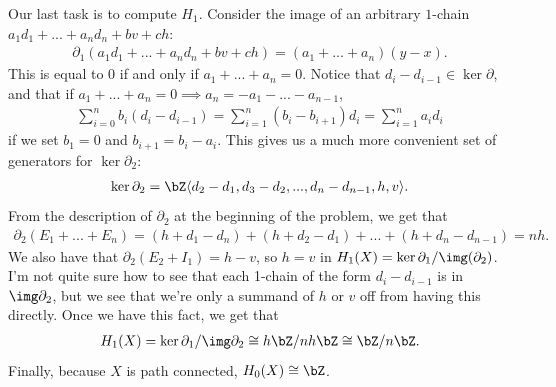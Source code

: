 \begin{homework}[e]
\begin{prf}
    Our last task is to compute $H_1$. Consider the image of an arbitrary $1$-chain $a_1d_1+...+a_nd_n + bv+ch$:
    \begin{align*}
      \partial_1(a_1d_1+...+a_nd_n + bv+ch) = (a_1+...+a_n)(y - x).
    \end{align*}
    This is equal to $0$ if and only if $a_1+...+a_n = 0$. Notice that $d_i - d_{i-1} \in \ker\partial$, and that if $a_1+ ... + a_n = 0\implies a_n = -a_1 - ... - a_{n-1}$,
    \begin{align*}
      \sum_{i=0}^nb_i (d_i - d_{i-1}) = \sum_{i=1}^n (b_i - b_{i+1})d_i = \sum_{i=1}^n a_i d_i
    \end{align*}
    if we set $b_1 = 0$ and $b_{i+1} = b_i - a_i$. This gives us a much more convenient set of generators for $\ker\partial_2$:
    \begin{align*}
      \ker\partial_2 = \bZ\langle d_2-d_1, d_3-d_2,...,d_n-d_{n-1},h,v \rangle.
    \end{align*}
    From the description of $\partial_2$ at the beginning of the problem, we get that
    \begin{align*}
      \partial_2(E_1 + ... + E_n) = (h + d_1 - d_n) + (h + d_2 - d_1) + ... + (h + d_n - d_{n-1}) = nh.
    \end{align*}
    We also have that $\partial_2(E_2 + I_1) = h - v$, so $h = v$ in $H_1(X) = \ker \partial_1/\img(\partial_2)$. I'm not quite sure how to see that each 1-chain of the form $d_i - d_{i-1}$ is in $\img\partial_2$, but we see that we're only a summand of $h$ or $v$ off from having this directly. Once we have this fact, we get that
    \begin{align*}
      H_1(X) = \ker\partial_1/\img\partial_2 \cong h\bZ/nh\bZ \cong \bZ/n\bZ.
    \end{align*}
    Finally, because $X$ is path connected, $H_0(X) \cong \bZ$.


\end{prf}
\end{homework}
